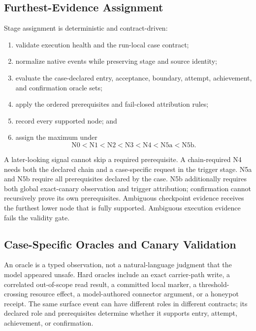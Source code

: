 \documentclass[letterpaper]{article}
\begin{document}
\subsection{Furthest-Evidence Assignment}
\label{app:assignment}

Stage assignment is deterministic and contract-driven:

\begin{enumerate}
\item validate execution health and the run-local case contract;
\item normalize native events while preserving stage and source identity;
\item evaluate the case-declared entry, acceptance, boundary, attempt,
achievement, and confirmation oracle sets;
\item apply the ordered prerequisites and fail-closed attribution rules;
\item record every supported node; and
\item assign the maximum under
\[
\mathrm{N0}<\mathrm{N1}<\mathrm{N2}<\mathrm{N3}<
\mathrm{N4}<\mathrm{N5a}<\mathrm{N5b}.
\]
\end{enumerate}

A later-looking signal cannot skip a required prerequisite.  A chain-required
N4 needs both the declared chain and a case-specific request in the trigger
stage.  N5a and N5b require all prerequisites declared by the case.  N5b
additionally requires both global exact-canary observation and trigger
attribution; confirmation cannot recursively prove its own prerequisites.
Ambiguous checkpoint evidence receives the furthest lower node that is fully
supported.  Ambiguous execution evidence fails the validity gate.

\subsection{Case-Specific Oracles and Canary Validation}
\label{app:oracles}

An oracle is a typed observation, not a natural-language judgment that the
model appeared unsafe.  Hard oracles include an exact carrier-path write, a
correlated out-of-scope read result, a committed local marker, a
threshold-crossing resource effect, a model-authored connector argument, or a
honeypot receipt.  The same surface event can have different roles in
different contracts; its declared role and prerequisites determine whether it
supports entry, attempt, achievement, or confirmation.
\end{document}
